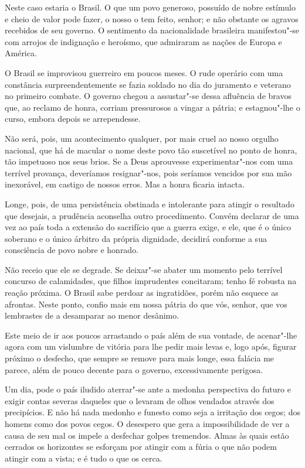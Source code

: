 Neste caso estaria o Brasil. O que um povo generoso, possuído de nobre
estímulo e cheio de valor pode fazer, o nosso o tem feito, senhor; e
não obstante os agravos recebidos de seu governo. O sentimento da
nacionalidade brasileira manifestou"-se com arrojos de indignação e
heroísmo, que admiraram as nações de Europa e América.

O Brasil se improvisou guerreiro em poucos meses. O rude operário com
uma constância surpreendentemente se fazia soldado no dia do juramento
e veterano no primeiro combate. O governo chegou a assustar"-se dessa
afluência de bravos que, ao reclamo de honra, corriam pressurosos a
vingar a pátria; e estagnou"-lhe o curso, embora depois se arrependesse. 

Não será, pois, um acontecimento qualquer, por mais cruel ao nosso
orgulho nacional, que há de macular o nome deste povo tão suscetível no
ponto de honra, tão impetuoso nos seus brios. Se a Deus aprouvesse
experimentar"-nos com uma terrível provança, deveríamos
resignar"-nos, pois seríamos vencidos por sua mão inexorável, em
castigo de nossos erros. Mas a honra ficaria intacta. 

Longe, pois, de uma persistência obstinada e intolerante para atingir o
resultado que desejais, a prudência aconselha outro procedimento.
Convém declarar de uma vez ao país toda a extensão do sacrifício que a
guerra exige, e ele, que é o único soberano e o único árbitro da
própria dignidade, decidirá conforme a sua consciência de povo nobre e honrado. 

Não receio que ele se degrade. Se deixar"-se abater um momento pelo
terrível concurso de calamidades, que filhos imprudentes concitaram;
tenho fé robusta na reação próxima. O Brasil sabe perdoar as
ingratidões, porém não esquece as afrontas. Neste ponto, confio mais em
nossa pátria do que vós, senhor, que vos lembrastes de a desamparar ao menor desânimo.

Este meio de ir aos poucos arrastando o país além de sua vontade, de
acenar"-lhe agora com um vislumbre de vitória para lhe pedir mais
levas e, logo após, figurar próximo o desfecho, que sempre se remove
para mais longe, essa falácia me parece, além de pouco decente para o
governo, excessivamente perigosa. 

Um dia, pode o país iludido aterrar"-se ante a medonha perspectiva do
futuro e exigir contas severas daqueles que o levaram de olhos vendados
através dos precipícios. E não há nada medonho e funesto como seja a
irritação dos cegos; dos homens como dos povos cegos. O desespero que
gera a impossibilidade de ver a causa de seu mal os impele a desfechar
golpes tremendos. Almas às quais estão cerrados os horizontes se
esforçam por atingir com a fúria o que não podem atingir com a vista; e
é tudo o que os cerca. 

